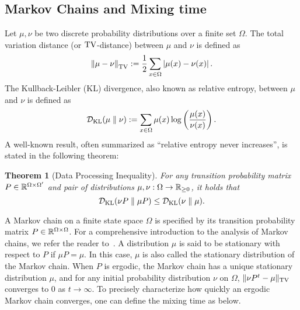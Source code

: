 \documentclass[11pt]{article}
\newtheorem{theorem}{Theorem} \newtheorem{lemma}[theorem]{Lemma} \newtheorem{proposition}[theorem]{Proposition} \newtheorem{corollary}[theorem]{Corollary} \newtheorem{definition}[theorem]{Definition} \newtheorem{conjecture}[theorem]{Conjecture} \newtheorem{claim}[theorem]{Claim} \newtheorem{fact}[theorem]{Fact}
\newcommand{\norm}[1]{\left\lVert #1 \right\rVert}
\newcommand{\norms}[1]{\lVert #1 \rVert}
\newcommand{\abss}[1]{\left\lvert #1 \right\rvert}
\newcommand{\paren}[1]{\left( #1 \right)}
\newcommand{\parens}[1]{( #1 )}
\begin{document}
{\subsection{Markov Chains and Mixing time}
Let $\mu,\nu$ be two discrete probability distributions over a finite set $\Omega$.
The total variation distance (or $\operatorname{TV}$-distance) between $\mu$ and $\nu$ is
 defined as
  \begin{equation*}
    \norm{\mu-\nu}_{\TV}:=\frac{1}{2}\sum_{x \in \Omega}\abss{\mu\parens{x}-\nu\parens{x}}.
  \end{equation*}
The Kullback-Leibler (KL) divergence, also known as relative entropy, between $\mu$ and $\nu$
  is defined as
  \begin{equation*}
    \cD_{\KL}\parens{\mu \parallel \nu}:=\sum_{x\in \Omega}\mu\parens{x}\log\paren{\frac{\mu\parens{x}}{\nu\parens{x}}}.
 \end{equation*}
A well-known result, often summarized as ``relative entropy never increases'', is stated in the following theorem:
\begin{theorem}[Data Processing Inequality]\label{thm:data-processing}
	For any transition probability matrix $P\in \mathbb{R}^{\Omega\times \Omega^\prime}$ and pair of distributions $\mu,\nu:\Omega\to \mathbb{R}_{\geq 0}$, it holds that 
	\begin{equation*}
		\cD_{\KL}\parens{\nu P \parallel \mu P}\leq \cD_{\KL}\parens{\nu \parallel \mu}.
	\end{equation*}
\end{theorem}
	
A Markov chain on a finite state space $\Omega$ is specified by its transition probability matrix $P \in \mathbb{R}^{\Omega \times \Omega}$. For a comprehensive introduction to the analysis of Markov chains, we refer the reader to~\cite{levin2017markov}. A distribution $\mu$ is said to be stationary with respect to $P$ if $\mu P = \mu$. In this case, $\mu$ is also called the stationary distribution of the Markov chain.
When $P$ is ergodic, the Markov chain has a unique stationary distribution $\mu$, and for any initial probability distribution $\nu$ on $\Omega$, $\norms{\nu P^t- \mu}_{\TV}$ converges to $0$ as $t \to \infty$. To precisely characterize how quickly an ergodic Markov chain converges, one can define the mixing time as below.

}
\end{document}
